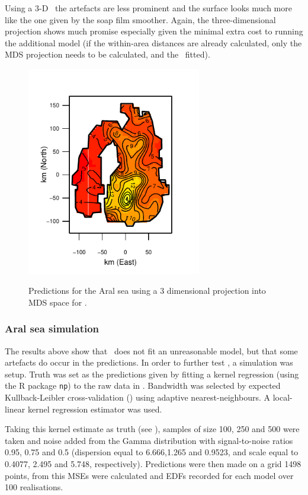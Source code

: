 {Using a 3-D \tprs\ the artefacts are less prominent and the surface looks much more like the one given by the soap film smoother. Again, the three-dimensional projection shows much promise especially given the minimal extra cost to running the additional model (if the within-area distances are already calculated, only the MDS projection needs to be calculated, and the \tprs\ fitted).

\begin{figure}
\centering
\includegraphics[width=3in]{mds/figs/aral-3d.pdf} \\
\caption{Predictions for the Aral sea using a 3 dimensional projection into MDS space for \mdsap.}
\label{aral-fit-3d}
\end{figure}

\subsubsection{Aral sea simulation}
\label{mds-aral-sea-sim}

The results above show that \mdsap\ does not fit an unreasonable model, but that some artefacts do occur in the predictions. In order to further test \mdsap, a simulation was setup. Truth was set as the predictions given by fitting a kernel regression (using the \textsf{R} package \texttt{np}) to the raw data in . Bandwidth was selected by expected Kullback-Leibler cross-validation (\cite{hurvich}) using adaptive nearest-neighbours. A local-linear kernel regression estimator was used. 

Taking this kernel estimate as truth (see ), samples of size 100, 250 and 500 were taken and noise added from the Gamma distribution with signal-to-noise ratios 0.95, 0.75 and 0.5 (dispersion equal to 6.666,1.265 and 0.9523, and scale equal to  0.4077, 2.495 and 5.748, respectively). Predictions were then made on a grid 1498 points, from this MSEs were calculated and EDFs recorded for each model over 100 realisations.

}
